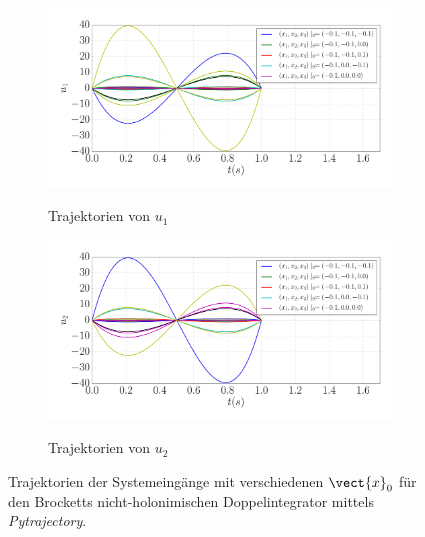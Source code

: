 \begin{figure}
	\centering
	\begin{subfigure}[b]{1\textwidth}
		\centering
		\includegraphics[width=15.5cm]{bild/30_32/Brockett_e2_Asy_Pytrajectory_d_01_u1.pdf}
		\label{fig:Trajektorien_von_u_1_aus_Pytrajectory}
		\caption{Trajektorien von $u_{1}$}
	\end{subfigure}%
	\hspace{1in} 
	\begin{subfigure}[b]{1\textwidth}
		\centering
		\includegraphics[width=15.5cm]{bild/30_32/Brockett_e2_Asy_Pytrajectory_d_01_u2.pdf}
		\label{fig:Trajektorien_von_u_2_aus_Pytrajectory}
		\caption{Trajektorien von $u_{2}$}
	\end{subfigure}
	\caption{Trajektorien der Systemeingänge mit verschiedenen $\vect{x}_{0}$ für den Brocketts nicht-holonimischen Doppelintegrator mittels \emph{Pytrajectory}.}
	\label{fig:Brocketts_Doppelintegrator_Asy_Pytr_ori}
\end{figure}